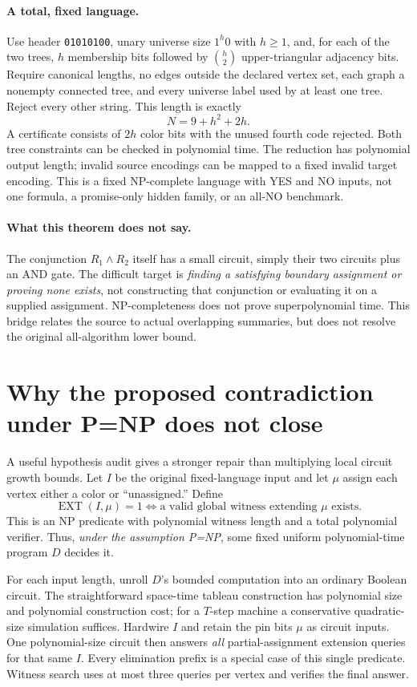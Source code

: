 \documentclass[11pt]{article}
\begin{document}
\paragraph{A total, fixed language.}
Use header \texttt{01010100}, unary universe size $1^h0$ with $h\ge1$, and,
for each of the two trees, $h$ membership bits followed by $\binom h2$
upper-triangular adjacency bits. Require canonical lengths, no edges outside
the declared vertex set, each graph a nonempty connected tree, and every
universe label used by at least one tree. Reject every other string.
This length is exactly
\[
 N=9+h^2+2h.
\]
A certificate consists of $2h$ color bits with the unused fourth code rejected.
Both tree constraints can be checked in polynomial time. The reduction has
polynomial output length; invalid source encodings can be mapped to a fixed
invalid target encoding. This is a fixed NP-complete language with YES and NO
inputs, not one formula, a promise-only hidden family, or an all-NO benchmark.

\paragraph{What this theorem does not say.}
The conjunction $R_1\land R_2$ itself has a small circuit, simply their two
circuits plus an AND gate. The difficult target is \emph{finding a satisfying
boundary assignment or proving none exists}, not constructing that conjunction
or evaluating it on a supplied assignment. NP-completeness does not prove
superpolynomial time. This bridge relates the source to actual overlapping
summaries, but does not resolve the original all-algorithm lower bound.

\section{Why the proposed contradiction under P=NP does not close}
A useful hypothesis audit gives a stronger repair than multiplying local
circuit growth bounds. Let $I$ be the original fixed-language input and let
$\mu$ assign each vertex either a color or ``unassigned.'' Define
\[
 \operatorname{EXT}(I,\mu)=1
 \iff\text{a valid global witness extending }\mu\text{ exists}.
\]
This is an NP predicate with polynomial witness length and a total
polynomial verifier. Thus, \emph{under the assumption P=NP}, some fixed
uniform polynomial-time program $D$ decides it.

For each input length, unroll $D$'s bounded computation into an ordinary
Boolean circuit. The straightforward space-time tableau construction has
polynomial size and polynomial construction cost; for a $T$-step machine a
conservative quadratic-size simulation suffices. Hardwire $I$ and retain the
pin bits $\mu$ as circuit inputs. One polynomial-size circuit then answers
\emph{all} partial-assignment extension queries for that same $I$. Every
elimination prefix is a special case of this single predicate. Witness search
uses at most three queries per vertex and verifies the final answer.
\end{document}
